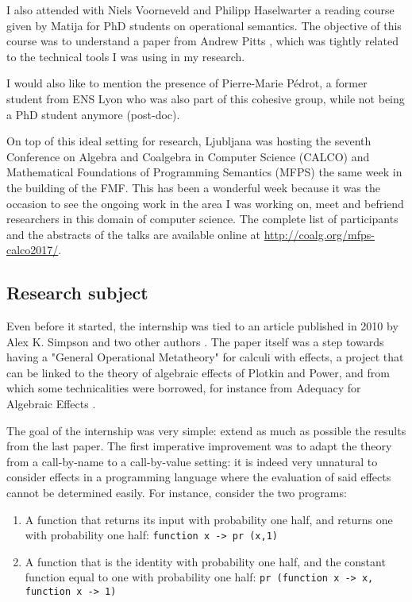 I also attended with Niels Voorneveld and Philipp Haselwarter 
a reading course given by Matija for PhD students on operational semantics. The 
objective of this course was to understand a paper from Andrew Pitts 
\cite{Pitts2000}, which was tightly related to the technical tools I was 
using in my research. 

I would also like to mention the presence of 
Pierre-Marie Pédrot, a former student from ENS Lyon 
who was also part of this cohesive group, while 
not being a PhD student anymore (post-doc).

On top of this ideal setting for research, 
Ljubljana was hosting the seventh Conference on Algebra and
Coalgebra in Computer Science (CALCO) and 
Mathematical Foundations of Programming Semantics (MFPS)
the same week in the building of the FMF. This has 
been a wonderful week because it was the occasion 
to see the ongoing work in the area I was working on,
meet and befriend researchers in this domain 
of computer science. The complete list of participants 
and the abstracts of the talks are
available online at \url{http://coalg.org/mfps-calco2017/}.

\subsection{Research subject}

Even before it started, the internship 
was tied to an article published in 2010 
by Alex K. Simpson and two other authors \cite{gom}.
The paper itself was a step towards having a 
"General Operational Metatheory" for calculi 
with effects, a project that can be linked 
to the theory of algebraic effects of Plotkin 
and Power, and from which some technicalities 
were borrowed, for instance from 
Adequacy for Algebraic Effects \cite{plotkin2001adequacy}.

The goal of the internship was very simple: extend 
as much as possible the results from the last paper. 
The first imperative improvement was to adapt the theory 
from a call-by-name to a call-by-value setting:
it is indeed very unnatural to consider effects in 
a programming language where the evaluation of said 
effects cannot be determined easily. For instance, consider 
the two programs:

\begin{enumerate}
    \item A function that returns its input with probability 
        one half, and returns one with probability one half: 
        \texttt{function x -> pr (x,1)}
    \item A function that is the identity with probability 
        one half, and the constant function equal to one 
        with probability one half: 
        \texttt{pr (function x -> x, function x -> 1)}
\end{enumerate}

